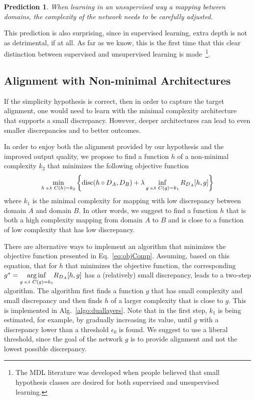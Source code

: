 \documentclass{article} %
\newtheorem{pred}{Prediction}
\newcommand{\disc}{\textnormal{disc}}
\begin{document}
\begin{pred}\label{pred2}
When learning in an unsupervised way a mapping between domains, the complexity of the network needs to be carefully adjusted.
\end{pred}

This prediction is also surprising, since in supervised learning, extra depth is not as detrimental, if at all. As far as we know, this is the first time that this clear distinction between supervised and unsupervised learning is made~\footnote{The MDL literature was developed when people believed that small hypothesis classes are desired for both supervised and unsupervised learning.}.

\subsection{Alignment with Non-minimal Architectures}

If the simplicity hypothesis is correct, then in order to capture the target alignment, one would need to learn with the minimal complexity architecture that supports a small discrepancy. However, deeper architectures can lead to even smaller discrepancies and to better outcomes.

In order to enjoy both the alignment provided by our hypothesis and the improved output quality, we propose to find a function $h$ of a non-minimal complexity $k_2$ that minimizes the following objective function
\begin{equation}\label{eq:objComp}
\min_{h  \textnormal{ s.t } C(h)=k_2 } \left\{\disc(h \circ D_A,D_B) + \lambda \inf_{g \textnormal{ s.t } C(g)=k_1} R_{D_A}[h,g]\right\}
\end{equation}
where $k_1$ is the minimal complexity for mapping with low discrepancy between domain $A$ and domain $B$. In other words, we suggest to find a function $h$ that is both a high complexity mapping from domain $A$ to $B$ and is close to a function of low complexity that has low discrepancy.

There are alternative ways to implement an algorithm that minimizes the objective function presented in Eq.~\ref{eq:objComp}. Assuming, based on this equation, that for $h$ that minimizes the objective function, the corresponding $g^* = \underset{g \textnormal{ s.t } C(g)=k_1}{\arg\inf} R_{D_A}[h,g]$ has a (relatively) small discrepancy, leads to a two-step algorithm. The algorithm first finds a function $g$ that has small complexity and small discrepancy and then finds $h$ of a larger complexity that is close to $g$. This is implemented in Alg.~\ref{algo:duallayers}. Note that in the first step, $k_1$ is being estimated, for example, by gradually increasing its value, until $g$ with a discrepancy lower than a threshold $\epsilon_0$ is found. We suggest to use a liberal threshold, since the goal of the network $g$ is to provide alignment and not the lowest possible discrepancy.
\end{document}
